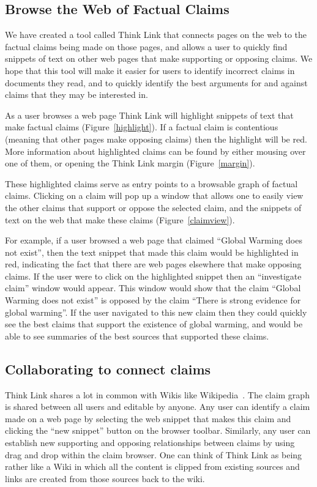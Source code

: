 \documentclass{chi2009}
\begin{document}
\subsection{Browse the Web of Factual Claims}

We have created a tool called Think Link that connects pages on the web to the factual claims being made on those pages, and allows a user to quickly find snippets of text on other web pages that make supporting or opposing claims. We hope that this tool will make it easier for users to identify incorrect claims in documents they read, and to quickly identify the best arguments for and against claims that they may be interested in.

As a user browses a web page Think Link will highlight snippets of text that make factual claims (Figure~\ref{highlight}). If a factual claim is contentious (meaning that other pages make opposing claims) then the highlight will be red. More information about highlighted claims can be found by either mousing over one of them, or opening the Think Link margin (Figure~\ref{margin}).

These highlighted claims serve as entry points to a browsable graph of factual claims. Clicking on a claim will pop up a window that allows one to easily view the other claims that support or oppose the selected claim, and the snippets of text on the web that make these claims (Figure~\ref{claimview}).

For example, if a user browsed a web page that claimed ``Global Warming does not exist'', then the text snippet that made this claim would be highlighted in red, indicating the fact that there are web pages elsewhere that make opposing claims. If the user were to click on the highlighted snippet then an ``investigate claim'' window would appear. This window would show that the claim ``Global Warming does not exist'' is opposed by the claim ``There is strong evidence for global warming''. If the user navigated to this new claim then they could quickly see the best claims that support the existence of global warming, and would be able to see summaries of the best sources that supported these claims.

\subsection{Collaborating to connect claims}

Think Link shares a lot in common with Wikis like Wikipedia~\cite{wikipedia}. The claim graph is shared between all users and editable by anyone. Any user can identify a claim made on a web page by selecting the web snippet that makes this claim and clicking the ``new snippet'' button on the browser toolbar. Similarly, any user can establish new supporting and opposing relationships between claims by using drag and drop within the claim browser. One can think of Think Link as being rather like a Wiki in which all the content is clipped from existing sources and links are created from those sources back to the wiki.
\end{document}
